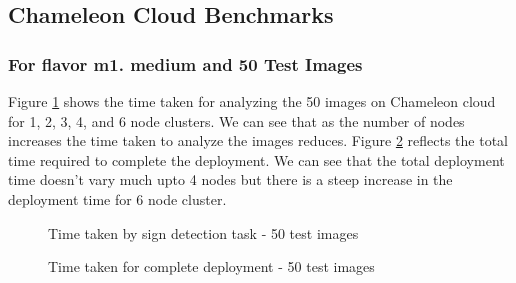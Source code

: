\documentclass[9pt,twocolumn,twoside]{../../styles/osajnl}
\begin{document}
\subsection{Chameleon Cloud Benchmarks}
\subsubsection{For flavor m1. medium and 50 Test Images}
Figure \ref{fig:cmed1} shows the time taken for analyzing the 50
images on Chameleon cloud for 1, 2, 3, 4, and 6 node clusters. We can
see that as the number of nodes increases the time taken to analyze
the images reduces. Figure \ref{fig:cmed2} reflects the total time
required to complete the deployment. We can see that the total
deployment time doesn't vary much upto 4 nodes but there is a steep
increase in the deployment time for 6 node cluster.
\begin{figure}[htbp]
\centering
{}
\caption{Time taken by sign detection task - 50 test images}
\label{fig:cmed1}
\end{figure}

\begin{figure}[htbp]
\centering
{}
\caption{Time taken for complete deployment - 50 test images}
\label{fig:cmed2}
\end{figure}
\end{document}
